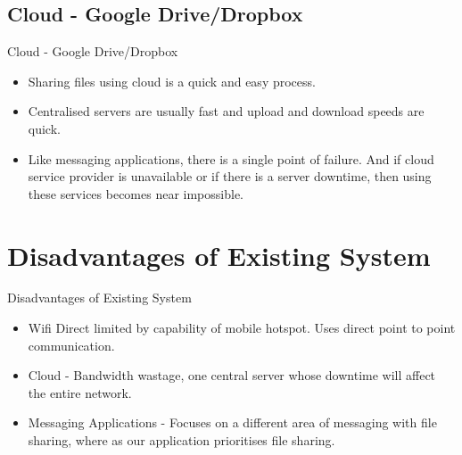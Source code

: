 \documentclass[9pt]{beamer}
\begin{document}
\subsection{Cloud - Google Drive/Dropbox}
\begin{frame}{Cloud - Google Drive/Dropbox}
 \begin{itemize}
     \item Sharing files using cloud is a quick and easy process.
     \item Centralised servers are usually fast and upload and download speeds are quick.
     \item Like messaging applications, there is a single point of failure. And if cloud service provider is unavailable or if there is a server downtime, then using these services becomes near impossible.
 \end{itemize}
\end{frame}

\section{Disadvantages of Existing System}
\begin{frame}{Disadvantages of Existing System}
 \begin{itemize}
     \item Wifi Direct limited by capability of mobile hotspot. Uses direct point to point communication. 
     \item Cloud - Bandwidth wastage, one central server whose downtime will affect the entire network. 
     \item Messaging Applications - Focuses on a different area of messaging with file sharing, where as our application prioritises file sharing. 
 \end{itemize}
\end{frame}
\end{document}
